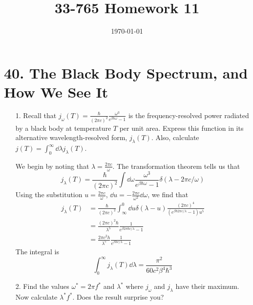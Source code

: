 \documentclass[a4paper,twoside]{article}
\title{33-765 Homework 11}
\date{\today}
\begin{document}
\maketitle

\section*{40. The Black Body Spectrum, and How We See It}
\begin{itemize}
    \item[1.] Recall that $ j_{\omega}(T) = \frac{\hbar}{(2 \pi c)^2} \frac{\omega^3}{e^{\beta \hbar \omega} - 1} $ is the frequency-resolved power radiated by a black body at temperature $ T $ per unit area. Express this function in its alternative wavelength-resolved form, $ j_{\lambda}(T) $. Also, calculate $ j(T) = \int_0^{\infty} \dd{\lambda} j_{\lambda}(T) $.
        \begin{problem}
            We begin by noting that $ \lambda = \frac{2 \pi c}{\omega} $. The transformation theorem tells us that
            \begin{equation}
                j_{\lambda}(T) = \frac{\hbar}{(2 \pi c)^2} \int \dd{\omega} \frac{\omega^3}{e^{\beta \hbar \omega} -1} \delta(\lambda - 2 \pi c / \omega)
            \end{equation}
            Using the substitution $ u = \frac{2 \pi c}{\omega} $, $ \dd{u} = - \frac{2 \pi c}{\omega^2} \dd{\omega} $, we find that
            \begin{align}
                j_{\lambda}(T) &= \frac{\hbar}{(2 \pi c)^2} \int_{\infty}^0 \dd{u} \delta(\lambda - u) \frac{(2 \pi c)^4}{(e^{\beta \hbar 2 \pi c / \lambda} - 1)u^5} \\
                &= \frac{(2 \pi c)^2 \hbar}{\lambda^5} \frac{1}{e^{\beta 2 \pi \hbar c / \lambda} -1} \\
                &= \frac{2 \pi c^2 h}{\lambda^5} \frac{1}{e^{\beta hc / \lambda} -1} 
            \end{align}
            The integral is
            \begin{equation}
                \int_0^{\infty} j_{\lambda}(T) \dd{\lambda} = \frac{\pi^2}{60 c^2 \beta^4 \hbar^3}
            \end{equation}
        \end{problem}
    \item[2.] Find the values $ \omega^* = 2 \pi f^* $ and $ \lambda^* $ where $ j_{\omega} $ and $ j_{\lambda} $ have their maximum. Now calculate $ \lambda^* f^* $. Does the result surprise you?

\end{itemize}
\end{document}
